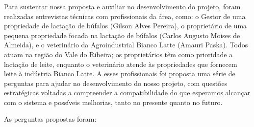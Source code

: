 Para sustentar nossa proposta e auxiliar no desenvolvimento do projeto, foram realizadas entrevistas técnicas com profissionais da área, como: o Gestor de uma propriedade de lactação de búfalos (Gilson Alves Pereira), o proprietário de uma pequena propriedade focada na lactação de búfalos (Carlos Augusto Moises de Almeida), e o veterinário da Agroindustrial Bianco Latte (Amauri Paska). Todos atuam na região do Vale do Ribeira; os proprietários têm como prioridade a lactação de leite, enquanto o veterinário atende às propriedades que fornecem leite à indústria Bianco Latte. A esses profissionais foi proposta uma série de perguntas para ajudar no desenvolvimento do nosso projeto, com questões estratégicas voltadas a compreender a compatibilidade do que esperamos alcançar com o sistema e possíveis melhorias, tanto no presente quanto no futuro.

As perguntas propostas foram:

